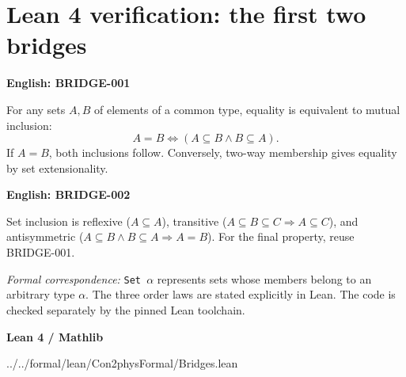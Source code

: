 \section{Lean 4 verification: the first two bridges}
\label{sec:lean-bridges-01-02}
\noindent\begin{minipage}[t]{0.44\textwidth}
\textbf{English: BRIDGE-001}

For any sets $A,B$ of elements of a common type, equality is equivalent
to mutual inclusion:
\[A=B\iff(A\subseteq B\land B\subseteq A).\]
If $A=B$, both inclusions follow. Conversely, two-way membership gives
equality by set extensionality.

\medskip\textbf{English: BRIDGE-002}

Set inclusion is reflexive ($A\subseteq A$), transitive
($A\subseteq B\subseteq C\Rightarrow A\subseteq C$), and
antisymmetric ($A\subseteq B\land B\subseteq A\Rightarrow A=B$).
For the final property, reuse BRIDGE-001.

\medskip\textit{Formal correspondence:} \texttt{Set $\alpha$} represents
sets whose members belong to an arbitrary type $\alpha$.
The three order laws are stated explicitly in Lean.
The code is checked separately by the pinned Lean toolchain.
\end{minipage}\hfill
\begin{minipage}[t]{0.53\textwidth}
\textbf{Lean 4 / Mathlib}


{../../formal/lean/Con2physFormal/Bridges.lean}
\end{minipage}
